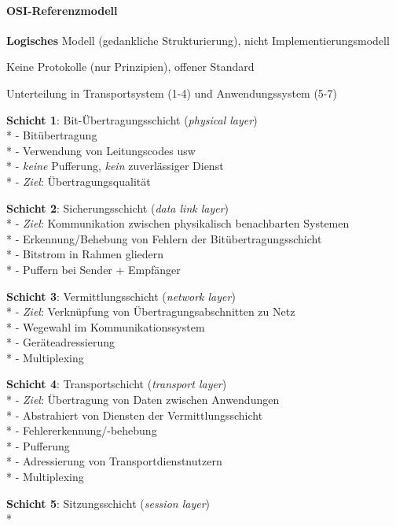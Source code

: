 \paragraph{OSI-Referenzmodell}
\begin{items}
\item \textbf{Logisches} Modell (gedankliche Strukturierung), nicht Implementierungsmodell
\item Keine Protokolle (nur Prinzipien), offener Standard
\item Unterteilung in Transportsystem (1-4) und Anwendungssystem (5-7)
\bigskip
  \item \textbf{Schicht 1}: Bit-Übertragungsschicht (\emph{physical layer}) \\*
    - Bitübertragung \\*
    - Verwendung von Leitungscodes usw \\*
    - \emph{keine} Pufferung, \emph{kein} zuverlässiger Dienst \\*
    - \emph{Ziel}: Übertragungsqualität
  \item \textbf{Schicht 2}: Sicherungsschicht (\emph{data link layer}) \\*
    - \emph{Ziel}: Kommunikation zwischen physikalisch benachbarten Systemen \\*
    - Erkennung/Behebung von Fehlern der Bitübertragungsschicht \\*
    - Bitstrom in Rahmen gliedern \\*
    - Puffern bei Sender + Empfänger
  \item \textbf{Schicht 3}: Vermittlungsschicht (\emph{network layer}) \\*
    - \emph{Ziel}: Verknüpfung von Übertragungsabschnitten zu Netz \\*
    - Wegewahl im Kommunikationssystem \\*
    - Geräteadressierung \\*
    - Multiplexing
  \item \textbf{Schicht 4}: Transportschicht (\emph{transport layer}) \\*
    - \emph{Ziel}: Übertragung von Daten zwischen Anwendungen \\*
    - Abstrahiert von Diensten der Vermittlungsschicht \\*
    - Fehlererkennung/-behebung \\*
    - Pufferung \\*
    - Adressierung von Transportdienstnutzern \\*
    - Multiplexing
  \item \textbf{Schicht 5}: Sitzungsschicht (\emph{session layer}) \\*

\end{items}
